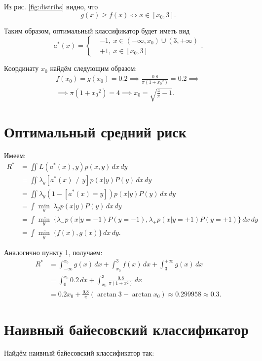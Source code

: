 \documentclass[14pt,a4paper]{article}
\begin{document}
	Из рис. \ref{fig:distribs} видно, что
	\[
		g(x) \geq f(x) \iff x \in [x_0, 3].
	\]
	
	Таким образом, оптимальный классификатор будет иметь вид
	\[
		a^*(x) = \left\{
		\begin{aligned}
			& -1, \ x \in (-\infty, x_0) \cup (3, +\infty) \\
			& +1, \ x \in [x_0, 3]
		\end{aligned}
		\right..
	\]
	
	Координату $x_0$ найдём следующим образом:
	\[
	\begin{gathered}
		f(x_0) = g(x_0) = 0.2 \implies \frac{0.8}{\pi (1 + {x_0}^2)} = 0.2 \implies \\
		\implies \pi (1 + {x_0}^2) = 4 \implies x_0 = \sqrt{\frac{4}{\pi} - 1}.
	\end{gathered}
	\]
	
    \section{Оптимальный средний риск}
    Имеем:
    \[
    	\begin{aligned}
    		R^* &= \iint L(a^*(x), y) p(x, y) \,dx\,dy \\
    		&= \iint \lambda_y [a^*(x) \neq y] p(x | y) P(y) \,dx\,dy \\
    		&= \iint \lambda_y (1 - [a^*(x) = y]) p(x | y) P(y) \,dx\,dy \\
    		&= \int \underset{y}{\min} \ \lambda_y p(x | y) P(y) \,dx\,dy \\
    		&= \int \underset{y}{\min} \ \{ \lambda_{-} p(x | y = -1) P(y = -1), \lambda_{+} p(x | y = +1) P(y = +1) \} \,dx\,dy \\
    		&= \int \underset{y}{\min} \ \{ f(x), g(x) \} \,dx\,dy.
    	\end{aligned}
    \]
    
    Аналогично пункту 1, получаем:
    \[
    	\begin{aligned}
    		R^* &= \int_{-\infty}^{x_0} g(x) \,dx + \int_{x_0}^{3} f(x) \,dx + \int_{3}^{+\infty} g(x) \,dx \\
    		&= \int_{0}^{x_0} 0.2 \,dx + \int_{x_0}^{3} \frac{0.8}{\pi (1 + x^2)} \,dx \\
    		&= 0.2 x_0 + \frac{0.8}{\pi} (\arctan{3} - \arctan{x_0}) \approx 0.299958 \approx 0.3.
    	\end{aligned}
    \]

    \section{Наивный байесовский классификатор}
    Найдём наивный байесовский классификатор так:
\end{document}
